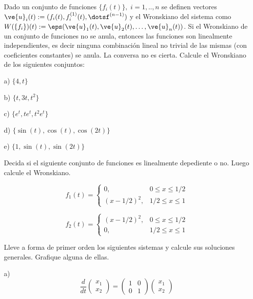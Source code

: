 



\bpro
Dado un conjunto de funciones $\{f_i(t)\}, \;i=1,..,n$ se definen vectores
$\ve{u}_i(t) := (f_i(t), f^{(1)}_i(t),\dotsf^{(n-1)})$ y el
Wronskiano del sistema como 
$W(\{f_i\})(t) := \eps(\ve{u}_1(t),\ve{u}_2(t),\dots, \ve{u}_n(t))$.
Si el Wronskiano de un conjunto de funciones no se anula, entonces las
funciones son linealmente independientes, es decir ninguna combinaci\'on 
lineal no trivial de las mismas (con coeficientes constantes) se anula.
La conversa no es cierta.
Calcule el Wronskiano de los siguientes conjuntos:

a) $\{4,t\}$

b) $\{t,3t,t^2\}$

c) $\{e^t, te^t, t^2e^t\}$

d) $\{ \sin(t), \cos(t), \cos(2t) \}$

e) $\{1, \sin(t), \sin(2t)\}$
\epro

\bpro
Decida si el siguiente conjunto de funciones es linealmente depediente o
no. Luego calcule el Wronskiano.

\begin{equation}
  f_1(t) = \left\{
    \begin{array}{ll}
      0, & 0 \leq x \leq 1/2 \\
      (x-1/2)^2, & 1/2 \leq x \leq 1
    \end{array}
    \right.
\end{equation}

\begin{equation}
  f_2(t) = \left\{
    \begin{array}{ll}
      (x-1/2)^2, & 0 \leq x \leq 1/2 \\
      0, & 1/2 \leq x \leq 1
    \end{array}
    \right.
\end{equation}
\epro

\bpro
Lleve a forma de primer orden los siguientes sistemas y calcule sus
soluciones generales. Grafique alguna de ellas.

a) 
\begin{equation}
  \label{eq:prob5_2a}
  \frac{d}{dt}\left(
    \begin{array}{c}
      x_1 \\ x_2
    \end{array}
  \right) = 
    \left(
      \begin{array}{cc}
        1 & 0 \\ 0 & 1
      \end{array}
    \right) \left(
      \begin{array}{c}
        x_1 \\ x_2
      \end{array}
      \right)
\end{equation}

